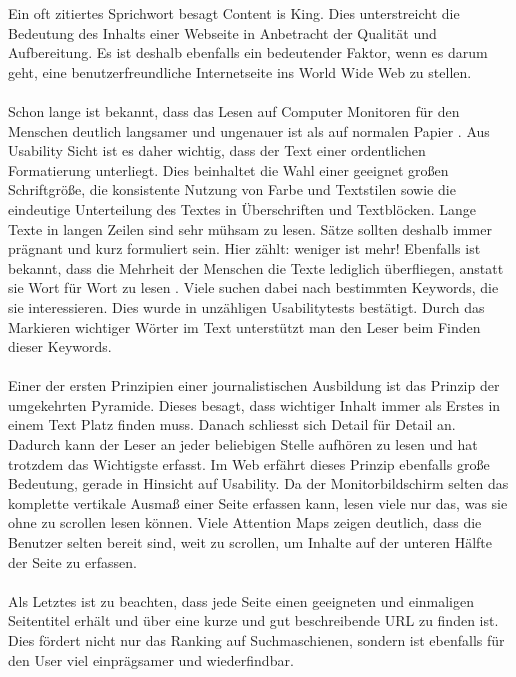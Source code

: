 Ein oft zitiertes Sprichwort besagt \glqq Content is King\grqq{}. Dies unterstreicht die Bedeutung des Inhalts einer Webseite in Anbetracht der Qualität und Aufbereitung. Es ist deshalb ebenfalls ein bedeutender Faktor, wenn es darum geht, eine benutzerfreundliche Internetseite ins World Wide Web zu stellen.\\
\\
Schon lange ist bekannt, dass das Lesen auf Computer Monitoren für den Menschen deutlich langsamer und ungenauer ist als auf normalen Papier \cite{screenvspaper}. Aus Usability Sicht ist es daher wichtig, dass der Text einer ordentlichen Formatierung unterliegt. Dies beinhaltet die Wahl einer geeignet großen Schriftgröße, die konsistente Nutzung von Farbe und Textstilen sowie die eindeutige Unterteilung des Textes in Überschriften und Textblöcken. Lange Texte in langen Zeilen sind sehr mühsam zu lesen. Sätze sollten deshalb immer prägnant und kurz formuliert sein. Hier zählt: weniger ist mehr! Ebenfalls ist bekannt, dass die Mehrheit der Menschen die Texte lediglich überfliegen, anstatt sie Wort für Wort zu lesen \cite{howtoreadinweb}. Viele suchen dabei nach bestimmten Keywords, die sie interessieren. Dies wurde in unzähligen Usabilitytests bestätigt. Durch das Markieren wichtiger Wörter im Text unterstützt man den Leser beim Finden dieser Keywords.\\
\\
Einer der ersten Prinzipien einer journalistischen Ausbildung ist das Prinzip der \glqq umgekehrten Pyramide\grqq{}. Dieses besagt, dass wichtiger Inhalt immer als Erstes in einem Text Platz finden muss. Danach schliesst sich Detail für Detail an. Dadurch kann der Leser an jeder beliebigen Stelle aufhören zu lesen und hat trotzdem das Wichtigste erfasst. Im Web erfährt dieses Prinzip ebenfalls große Bedeutung, gerade in Hinsicht auf Usability. Da der Monitorbildschirm selten das komplette vertikale Ausmaß einer Seite erfassen kann, lesen viele nur das, was sie ohne zu scrollen lesen können. Viele Attention Maps zeigen deutlich, dass die Benutzer selten bereit sind, weit zu scrollen, um Inhalte auf der unteren Hälfte der Seite zu erfassen.\\
\\
Als Letztes ist zu beachten, dass jede Seite einen geeigneten und einmaligen Seitentitel erhält und über eine kurze und gut beschreibende URL zu finden ist. Dies fördert nicht nur das Ranking auf Suchmaschienen, sondern ist ebenfalls für den User viel einprägsamer und wiederfindbar.